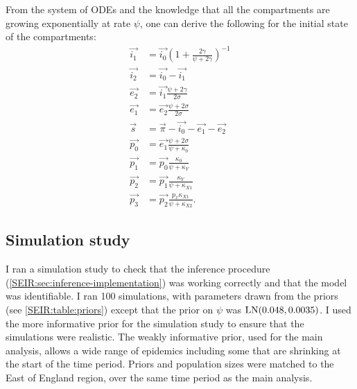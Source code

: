 \documentclass[thesis.tex]{subfiles}
\begin{document}
From the system of ODEs and the knowledge that all the compartments are growing exponentially at rate $\psi$, one can derive the following for the initial state of the compartments:
\begin{align}
    \vec{i_1} &= \vec{i_0} \left(1 + \frac{2\gamma}{\psi + 2\gamma} \right)^{-1} \\
    \vec{i_2} &= \vec{i_0} - \vec{i_1} \\
    \vec{e_2} &= \vec{i_1} \frac{\psi + 2\gamma}{2\sigma} \\
    \vec{e_1} &= \vec{e_2} \frac{\psi + 2\sigma}{2\sigma} \\
    \vec{s} &= \vec{\pi} - \vec{i_0} - \vec{e_1} - \vec{e_2} \\
    \vec{p_0} &= \vec{e_1} \frac{\psi + 2\sigma}{\psi + \kappa_0} \\
    \vec{p_1} &= \vec{p_0} \frac{\kappa_0}{\psi + \kappa_Y} \\
    \vec{p_2} &= \vec{p_1} \frac{\kappa_Y}{\psi + \kappa_{X1}} \\
    \vec{p_3} &= \vec{p_2} \frac{p_x \kappa_{X1}}{\psi + \kappa_{X2}}.
\end{align}

\subsection{Simulation study} \label{SEIR:sec:sim-study}

I ran a simulation study to check that the inference procedure (\cref{SEIR:sec:inference-implementation}) was working correctly and that the model was identifiable.
I ran 100 simulations, with parameters drawn from the priors (see \cref{SEIR:table:priors}) except that the prior on $\psi$ was $\operatorname{LN}(0.048, 0.0035)$.
I used the more informative prior for the simulation study to ensure that the simulations were realistic.
The weakly informative prior, used for the main analysis, allows a wide range of epidemics including some that are shrinking at the start of the time period.
Priors and population sizes were matched to the East of England region, over the same time period as the main analysis.
\end{document}
